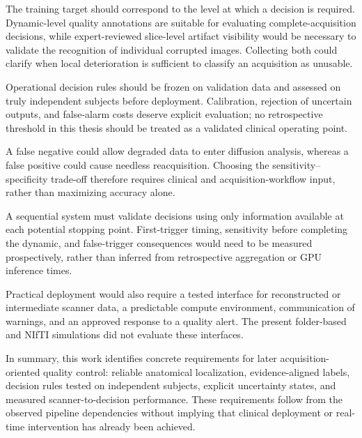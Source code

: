 The training target should correspond to the level at which a decision is required. Dynamic-level quality annotations are suitable for evaluating complete-acquisition decisions, while expert-reviewed slice-level artifact visibility would be necessary to validate the recognition of individual corrupted images. Collecting both could clarify when local deterioration is sufficient to classify an acquisition as unusable.

Operational decision rules should be frozen on validation data and assessed on truly independent subjects before deployment. Calibration, rejection of uncertain outputs, and false-alarm costs deserve explicit evaluation; no retrospective threshold in this thesis should be treated as a validated clinical operating point.

A false negative could allow degraded data to enter diffusion analysis, whereas a false positive could cause needless reacquisition. Choosing the sensitivity--specificity trade-off therefore requires clinical and acquisition-workflow input, rather than maximizing accuracy alone.

A sequential system must validate decisions using only information available at each potential stopping point. First-trigger timing, sensitivity before completing the dynamic, and false-trigger consequences would need to be measured prospectively, rather than inferred from retrospective aggregation or GPU inference times.

Practical deployment would also require a tested interface for reconstructed or intermediate scanner data, a predictable compute environment, communication of warnings, and an approved response to a quality alert. The present folder-based and NIfTI simulations did not evaluate these interfaces.

In summary, this work identifies concrete requirements for later acquisition-oriented quality control: reliable anatomical localization, evidence-aligned labels, decision rules tested on independent subjects, explicit uncertainty states, and measured scanner-to-decision performance. These requirements follow from the observed pipeline dependencies without implying that clinical deployment or real-time intervention has already been achieved.